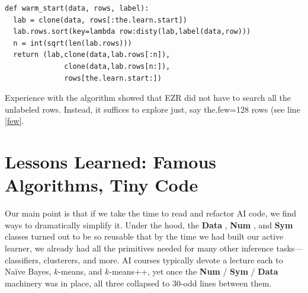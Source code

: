 \documentclass[AMA,STIX2COL]{WileyNJDv5}
\newcommand{\cls}[1]{%
  \setlength{\fboxsep}{1.5pt}%
  \colorbox{clsbg}{\sffamily\bfseries{#1}}%
}
\begin{document}
 \begin{verbatim}
def warm_start(data, rows, label): 
  lab = clone(data, rows[:the.learn.start])
  lab.rows.sort(key=lambda row:disty(lab,label(data,row)))
  n = int(sqrt(len(lab.rows)))
  return (lab,clone(data,lab.rows[:n]),
              clone(data,lab.rows[n:]),
              rows[the.learn.start:])
\end{verbatim}
Experience with the algorithm showed that EZR did not have to search all the unlabeled
rows. Instead, it suffices to explore just, say \textsf{the.few}=128 rows (see
line \ref{few}.
 

\section{Lessons Learned: Famous Algorithms, Tiny Code}
Our main point is that if we take the time to read and refactor
AI code, we find ways to dramatically simplify it. Under the hood,
the \cls{Data}, \cls{Num}, and \cls{Sym} classes turned out to be
so reusable that by the time we had built our active learner, we
already had all the primitives needed for many other inference
tasks---classifiers, clusterers, and more. AI courses typically
devote a lecture each to Na\"ive Bayes, $k$-means, and $k$-means++,
yet once the \cls{Num}/\cls{Sym}/\cls{Data} machinery was in place,
all three collapsed to 30-odd lines between them.
\end{document}
